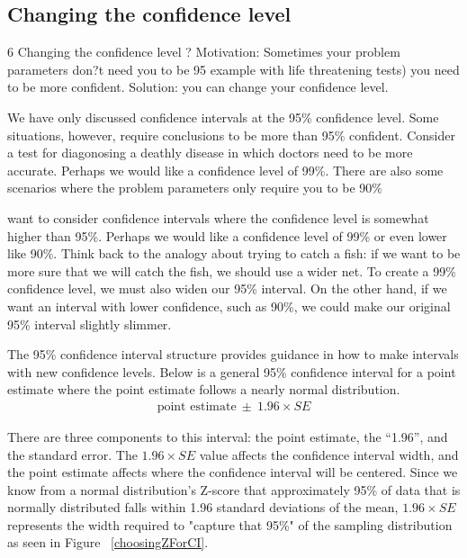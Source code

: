 \subsection{Changing the confidence level}
\label{changingTheConfidenceLevelSection}

6 Changing the confidence level
? Motivation: Sometimes your problem parameters don?t need you to be 95%
example with life threatening tests) you need to be more confident. Solution: you can change your
confidence level.



We have only discussed confidence intervals at the 95\% confidence level. Some situations, however, require conclusions to be more than 95\% confident. Consider a test for diagonosing a deathly disease in which doctors need to be more accurate. Perhaps we would like a confidence level of 99\%. There are also some scenarios where the problem parameters only require you to be 90\%

want to consider confidence intervals where the confidence level is somewhat higher than 95\%. Perhaps we would like a confidence level of 99\% or even lower like 90\%. Think back to the analogy about trying to catch a fish: if we want to be more sure that we will catch the fish, we should use a wider net. To create a 99\% confidence level, we must also widen our 95\% interval. On the other hand, if we want an interval with lower confidence, such as 90\%, we could make our original 95\% interval slightly slimmer.

The 95\% confidence interval structure provides guidance in how to make intervals with new confidence levels. Below is a general 95\% confidence interval for a point estimate where the point estimate follows a nearly normal distribution.
\begin{eqnarray}
\text{point estimate}\ \pm\ 1.96\times SE
\end{eqnarray}

There are three components to this interval: the point estimate, the ``1.96'', and the standard error.  The $1.96\times SE$ value affects the confidence interval width, and the point estimate affects where the confidence interval will be centered. Since we know from a normal distribution's Z-score that approximately 95\% of data that is normally distributed falls within 1.96 standard deviations of the mean, $1.96\times SE$ represents the width required to "capture that 95\%" of the sampling distribution as seen in Figure ~\ref{choosingZForCI}. 
 
